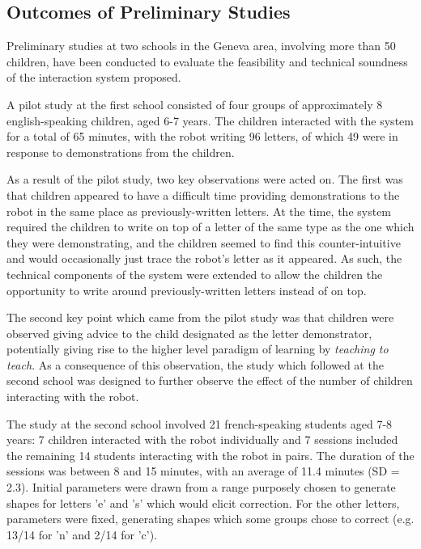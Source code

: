 \documentclass{sig-alternate}
\begin{document}
\subsection{Outcomes of Preliminary Studies}

Preliminary studies at two schools in the Geneva area, involving more than 50 children, 
have been conducted to evaluate the feasibility and technical soundness of the 
interaction system proposed. 

A pilot study at the first school consisted of four groups of
approximately 8 english-speaking children, aged 6-7 years. The children
interacted with the system for a total of 65 minutes, with the robot writing 96
letters, of which 49 were in response to demonstrations from the children. 

As a result of the pilot study, two key observations were acted on. The first
was that children appeared to have a difficult time providing demonstrations to
the robot in the same place as previously-written letters. At the time, the
system required the children to write on top of a letter of the same type as the
one which they were demonstrating, and the children seemed to find this
counter-intuitive and would occasionally just trace the robot's letter as it
appeared. As such, the technical components of the system were extended to allow
the children the opportunity to write around previously-written letters instead
of on top. 

The second key point which came from the pilot study was that children were
observed giving advice to the child designated as the letter demonstrator,
potentially giving rise to the higher level paradigm of learning by
\emph{teaching to teach}. As a consequence of this observation, the study which
followed at the second school was designed to further observe the effect of the
number of children interacting with the robot.

The study at the second school involved 21 french-speaking students aged 7-8 years: 7 children
interacted with the robot individually and 7 sessions included the remaining
14 students interacting with the robot in pairs. The duration of the sessions
was between 8 and 15 minutes, with an average of 11.4 minutes (SD = 2.3). 
Initial parameters were drawn from a range purposely chosen to generate shapes 
for letters 'e' and 's' which would elicit correction. For the other letters, 
parameters were fixed, generating shapes which some groups chose to correct 
(e.g. 13/14 for 'n' and 2/14 for 'c').
\end{document}
